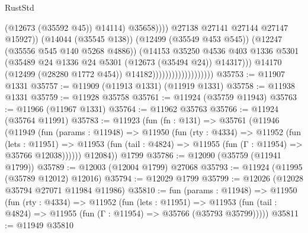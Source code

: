 \begin{lexlean}{RustStd}
\begin{coremodule}
                                                          (@12673 (@35592 @45))
                                                          @14114)
                                                        @35658))))
                                                @27138
                                                @27141
                                                @27144
                                                @27147
                                                @15927))
                                            (@14044 (@35545 @138))
                                            (@12499 (@35549 @453 @545))
                                            (@12247 (@35556 @545 @140 @5268 @4886))
                                            (@14153
                                              @35250
                                              @4536
                                              @403
                                              @1336
                                              @5301
                                              (@35489
                                                @24
                                                @1336
                                                @24
                                                @5301
                                                (@12673 (@35494 @24))
                                                @14317)))
                                          @14170
                                          (@12499 (@28280 @1772 @454))
                                          @14182)))))))))))))))))))
@35753 := @11907 @1331
@35757 := @11909 (@11913 @1331) (@11919 @1331)
@35758 := @11938 @1331
@35759 := @11928 @35758
@35761 := @11924 (@35759 @11943)
@35763 := @11966 (@11967 @1331)
@35764 := @11962 @35763
@35766 := @11924 (@35764 @11991)
@35783 := @11923
    (fun (fn : @131) =>
    @35761
      (@11946
        (@11949
          (fun (params : @11948) =>
          @11950
            (fun (rty : @4334) =>
            @11952
              (fun (lets : @11951) =>
              @11953 (fun (tail : @4824) => @11955 (fun (Γ : @11954) => @35766 @12038))))))
        @12084))
    @1799
@35786 := @12090 (@35759 (@11941 @1799))
@35789 := @12003 (@12004 @1799) @27068
@35793 := @11924 (@11995 (@35789 @12012) @12016)
@35794 := @12029 @1799
@35799 := @12026 (@12028 @35794 @27071 @11984 @11986)
@35810 := fun (params : @11948) =>
  @11950
    (fun (rty : @4334) =>
    @11952
      (fun (lets : @11951) =>
      @11953 (fun (tail : @4824) => @11955 (fun (Γ : @11954) => @35766 (@35793 @35799)))))
@35811 := @11949 @35810

\end{coremodule}
\end{lexlean}
